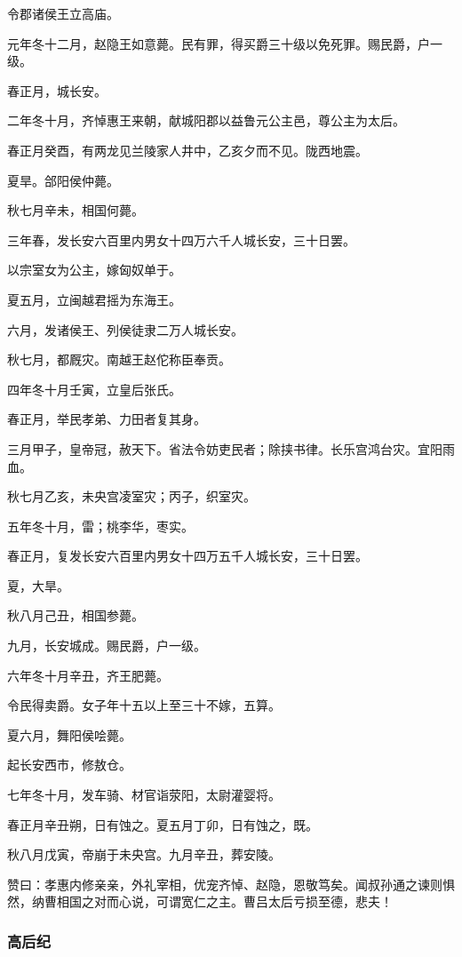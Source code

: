 \documentclass[]{article}
\begin{document}
令郡诸侯王立高庙。

元年冬十二月，赵隐王如意薨。民有罪，得买爵三十级以免死罪。赐民爵，户一级。

春正月，城长安。

二年冬十月，齐悼惠王来朝，献城阳郡以益鲁元公主邑，尊公主为太后。

春正月癸酉，有两龙见兰陵家人井中，乙亥夕而不见。陇西地震。

夏旱。郃阳侯仲薨。

秋七月辛未，相国何薨。

三年春，发长安六百里内男女十四万六千人城长安，三十日罢。

以宗室女为公主，嫁匈奴单于。

夏五月，立闽越君摇为东海王。

六月，发诸侯王、列侯徒隶二万人城长安。

秋七月，都厩灾。南越王赵佗称臣奉贡。

四年冬十月壬寅，立皇后张氏。

春正月，举民孝弟、力田者复其身。

三月甲子，皇帝冠，赦天下。省法令妨吏民者；除挟书律。长乐宫鸿台灾。宜阳雨血。

秋七月乙亥，未央宫凌室灾；丙子，织室灾。

五年冬十月，雷；桃李华，枣实。

春正月，复发长安六百里内男女十四万五千人城长安，三十日罢。

夏，大旱。

秋八月己丑，相国参薨。

九月，长安城成。赐民爵，户一级。

六年冬十月辛丑，齐王肥薨。

令民得卖爵。女子年十五以上至三十不嫁，五算。

夏六月，舞阳侯哙薨。

起长安西市，修敖仓。

七年冬十月，发车骑、材官诣荥阳，太尉灌婴将。

春正月辛丑朔，日有蚀之。夏五月丁卯，日有蚀之，既。

秋八月戊寅，帝崩于未央宫。九月辛丑，葬安陵。

赞曰：孝惠内修亲亲，外礼宰相，优宠齐悼、赵隐，恩敬笃矣。闻叔孙通之谏则惧然，纳曹相国之对而心说，可谓宽仁之主。曹吕太后亏损至德，悲夫！

\hypertarget{header-n188}{%
\subsubsection{高后纪}\label{header-n188}}
\end{document}
